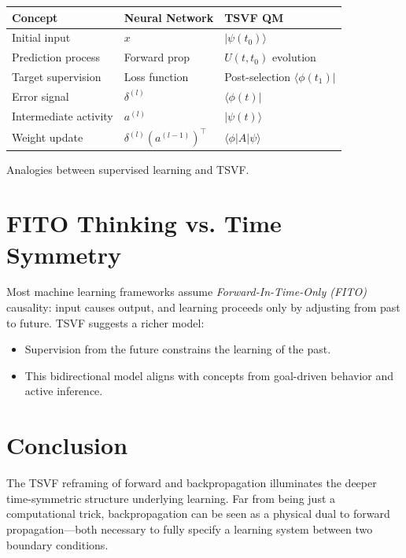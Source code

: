 {{{{{{\begin{marginfigure}
\hspace{-38pt}
\footnotesize
\begin{tabular}{@{}lll@{}}
\toprule
\textbf{Concept} & \textbf{Neural Network} & \textbf{TSVF QM} \\
\midrule
Initial input & \(x\) & \(|\psi(t_0)\rangle\) \\
Prediction process & Forward prop & \(U(t, t_0)\) evolution \\
Target supervision & Loss function & Post-selection \(\langle\phi(t_1)|\) \\
Error signal & \(\delta^{(l)}\) & \(\langle\phi(t)|\) \\
Intermediate activity & \(a^{(l)}\) & \(|\psi(t)\rangle\) \\
Weight update & \(\delta^{(l)} (a^{(l-1)})^\top\) & \(\langle \phi | A | \psi \rangle\) \\
\bottomrule
\end{tabular}
\caption{Analogies between supervised learning and TSVF.}
\end{marginfigure}

\section{FITO Thinking vs. Time Symmetry}

Most machine learning frameworks assume \emph{Forward-In-Time-Only (FITO)} causality: input causes output, and learning proceeds only by adjusting from past to future. TSVF suggests a richer model:

\begin{itemize}
  \item Supervision from the future constrains the learning of the past.
  \item This bidirectional model aligns with concepts from goal-driven behavior and active inference.
\end{itemize}


\section{Conclusion}

The TSVF reframing of forward and backpropagation illuminates the deeper time-symmetric structure underlying learning. Far from being just a computational trick, backpropagation can be seen as a physical dual to forward propagation—both necessary to fully specify a learning system between two boundary conditions.

}}}}}}
